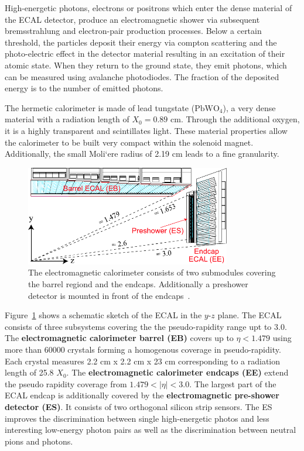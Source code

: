 High-energetic photons, electrons or positrons which enter the dense material of the ECAL
detector, produce an electromagnetic shower via subsequent bremsstrahlung and
electron-pair production processes. Below a certain threshold, the particles
deposit their energy via compton scattering and the photo-electric effect in the
detector material resulting in an excitation of their atomic state. When they
return to the ground state, they emit photons, which can be measured using
avalanche photodiodes. The fraction of the deposited energy is to the number of
emitted photons.

The hermetic calorimeter is made of lead tungstate ($\mathrm{PbWO}_4$), a very
dense material with a radiation length of $X_0 = 0.89$ cm. Through the
additional oxygen, it is a highly transparent and scintillates light. These
material properties allow the calorimeter to be built very compact within the
solenoid magnet. Additionally, the small Moli`ere  radius of 2.19 cm leads to a
fine granularity. 

\begin{figure}[htp]
    \centering
    \includegraphics[width=0.8\textwidth]{figures/cms_detector/cms_ecal.pdf}\hfill
    \caption[Electromagnetic Calorimeter]{The electromagnetic calorimeter
    consists of two submodules covering the barrel regiond and the endcaps.
    Additionally a preshower detector is mounted in front of the
    endcaps~\cite{cms:ecal}.}
    \label{fig:cms:ecal}
\end{figure}

Figure~\ref{fig:cms:ecal} shows a schematic sketch of the ECAL in the $y$-$z$
plane. The ECAL consists of three subsystems covering the the pseudo-rapidity
range upt to 3.0. The \textbf{electromagnetic calorimeter barrel (EB)} covers up
to $\eta < 1.479$ using more than 60000 crystals forming a homogenous coverage
in pseudo-rapidity. Each crystal measures 2.2 cm x 2.2 cm x 23 cm corresponding
to a radiation length of 25.8 $X_0$. The \textbf{electromagnetic calorimeter
endcaps (EE)} extend the pseudo rapidity coverage from $1.479 < |\eta| < 3.0$.
The largest part of the ECAL endcap is additionally covered by the
\textbf{electromagnetic pre-shower detector (ES)}. It consists of two orthogonal
silicon strip sensors. The ES improves the discrimination between single
high-energetic photos and less interesting low-energy photon pairs as well as
the discrimination between neutral pions and photons.


